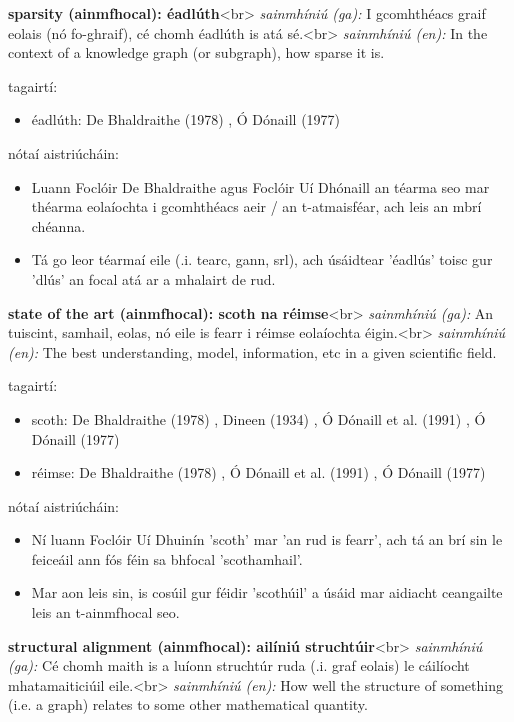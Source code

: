 \documentclass{article}
\begin{document}
\textbf{sparsity (ainmfhocal): éadlúth}<br>
\textit{sainmhíniú (ga):} I gcomhthéacs graif eolais (nó fo-ghraif), cé chomh éadlúth is atá sé.<br>
\textit{sainmhíniú (en):} In the context of a knowledge graph (or subgraph), how sparse it is.

tagairtí:
\begin{itemize}
	\item éadlúth: De Bhaldraithe (1978) \cite{de-bhaldraithe}, Ó Dónaill (1977) \cite{odonaill}
\end{itemize}

nótaí aistriúcháin:
\begin{itemize}
	\item Luann Foclóir De Bhaldraithe agus Foclóir Uí Dhónaill an téarma seo  mar théarma eolaíochta i gcomhthéacs aeir / an t-atmaisféar, ach leis an mbrí chéanna.
	\item Tá go leor téarmaí eile (.i. tearc, gann, srl), ach úsáidtear 'éadlús' toisc gur 'dlús' an focal atá ar a mhalairt de rud.
\end{itemize}


\textbf{state of the art (ainmfhocal): scoth na réimse}<br>
\textit{sainmhíniú (ga):} An tuiscint, samhail, eolas, nó eile is fearr i réimse eolaíochta éigin.<br>
\textit{sainmhíniú (en):} The best understanding, model, information, etc in a given scientific field.

tagairtí:
\begin{itemize}
	\item scoth: De Bhaldraithe (1978) \cite{de-bhaldraithe}, Dineen (1934) \cite{dineen}, Ó Dónaill et al. (1991) \cite{focloir-beag}, Ó Dónaill (1977) \cite{odonaill}
	\item réimse: De Bhaldraithe (1978) \cite{de-bhaldraithe}, Ó Dónaill et al. (1991) \cite{focloir-beag}, Ó Dónaill (1977) \cite{odonaill}
\end{itemize}

nótaí aistriúcháin:
\begin{itemize}
	\item Ní luann Foclóir Uí Dhuinín 'scoth' mar 'an rud is fearr', ach tá an brí sin le feiceáil ann fós féin sa bhfocal 'scothamhail'.
	\item Mar aon leis sin, is cosúil gur féidir 'scothúil' a úsáid mar aidiacht ceangailte leis an t-ainmfhocal seo.
\end{itemize}


\textbf{structural alignment (ainmfhocal): ailíniú struchtúir}<br>
\textit{sainmhíniú (ga):} Cé chomh maith is a luíonn struchtúr ruda (.i. graf eolais) le cáilíocht mhatamaiticiúil eile.<br>
\textit{sainmhíniú (en):} How well the structure of something (i.e. a graph) relates to some other mathematical quantity.
\end{document}

